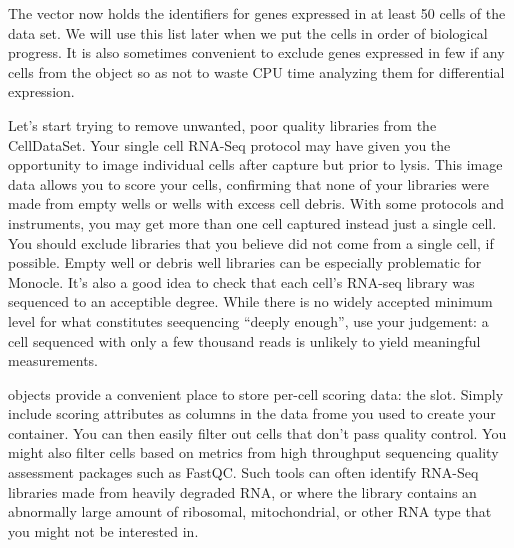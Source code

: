 \documentclass[10pt,oneside]{article}\usepackage[]{graphicx}\usepackage[]{color}
\begin{document}
 The vector  now holds the identifiers for genes expressed in at least 50 cells of the data set. We will use this list later when we put the cells in order of biological progress. It is also sometimes convenient to exclude genes expressed in few if any cells from the  object so as not to waste CPU time analyzing them for differential expression.
 
 Let's start trying to remove unwanted, poor quality libraries from the CellDataSet. Your single cell RNA-Seq protocol may have given you the opportunity to image individual cells after capture but prior to lysis. This image data allows you to score your cells, confirming that none of your libraries were made from empty wells or wells with excess cell debris.  With some protocols and instruments, you may get more than one cell captured instead just a single cell. You should exclude libraries that you believe did not come from a single cell, if possible. Empty well or debris well libraries can be especially problematic for Monocle. It's also a good idea to check that each cell's RNA-seq library was sequenced to an acceptible degree.  While there is no widely accepted minimum level for what constitutes seequencing ``deeply enough'', use your judgement: a cell sequenced with only a few thousand reads is unlikely to yield meaningful measurements.   
 
  objects provide a convenient place to store per-cell scoring data: the  slot.  Simply include scoring attributes as columns in the data frome you used to create your  container.  You can then easily filter out cells that don't pass quality control. You might also filter cells based on metrics from high throughput sequencing quality assessment packages such as FastQC. Such tools can often identify RNA-Seq libraries made from heavily degraded RNA, or where the library contains an abnormally large amount of ribosomal, mitochondrial, or other RNA type that you might not be interested in.
 
\end{document}
